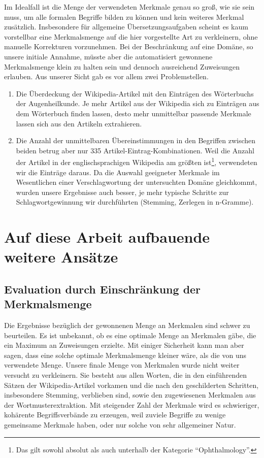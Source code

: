 \documentclass[pagesize,paper=A4,DIV=calc,fontsize=12pt,draft=false]{scrreprt}
\begin{document}
Im Idealfall ist die Menge der verwendeten Merkmale genau so groß, wie sie sein muss, um alle formalen Begriffe bilden zu können und kein weiteres Merkmal zusätzlich. 
Insbesondere für allgemeine Übersetzungsaufgaben scheint es kaum vorstellbar eine Merkmalsmenge auf die hier vorgestellte Art zu verkleinern, ohne manuelle Korrekturen vorzunehmen. 
Bei der Beschränkung auf eine Domäne, so unsere initiale Annahme, müsste aber die automatisiert gewonnene Merkmalsmenge klein zu halten sein und dennoch ausreichend Zuweisungen erlauben. 
Aus unserer Sicht gab es vor allem zwei Problemstellen. 
\begin{enumerate}
\item Die Überdeckung der Wikipedia-Artikel mit den Einträgen des Wörterbuchs der Augenheilkunde. 
Je mehr Artikel aus der Wikipedia sich zu Einträgen aus dem Wörterbuch finden lassen, desto mehr unmittelbar passende Merkmale lassen sich aus den Artikeln extrahieren. 
\item Die Anzahl der unmittelbaren Übereinstimmungen in den Begriffen zwischen beiden betrug aber nur 335 Artikel-Eintrag-Kombinationen. 
Weil die Anzahl der Artikel in der englischsprachigen Wikipedia am größten ist\footnote{Das gilt sowohl absolut als auch unterhalb der Kategorie \enquote{Ophthalmology}.}, verwendeten wir die Einträge daraus. 
Da die Auswahl geeigneter Merkmale im Wesentlichen einer Verschlagwortung der untersuchten Domäne gleichkommt, wurden unsere Ergebnisse auch besser, je mehr typische Schritte zur Schlagwortgewinnung wir durchführten (Stemming, Zerlegen in n-Gramme). 
\end{enumerate}

\section{Auf diese Arbeit aufbauende weitere Ansätze}
\subsection{Evaluation durch Einschränkung der Merkmalsmenge}

Die Ergebnisse bezüglich der gewonnenen Menge an Merkmalen sind schwer zu beurteilen.
Es ist unbekannt, ob es eine optimale Menge an Merkmalen gäbe, die ein Maximum an Zuweisungen erzielte.
Mit einiger Sicherheit kann man aber sagen, dass eine solche optimale Merkmalsmenge kleiner wäre, als die von uns verwendete Menge.
Unsere finale Menge von Merkmalen wurde nicht weiter versucht zu verkleinern.
Sie besteht aus allen Worten, die in den einführenden Sätzen der Wikipedia-Artikel vorkamen und die nach den geschilderten Schritten, insbesondere Stemming, verblieben sind, sowie den zugewiesenen Merkmalen aus der Wortmusterextraktion.
Mit steigender Zahl der Merkmale wird es schwieriger, kohärente Begriffsverbände zu erzeugen, weil zuviele Begriffe zu wenige gemeinsame Merkmale haben, oder nur solche von sehr allgemeiner Natur.
\end{document}
